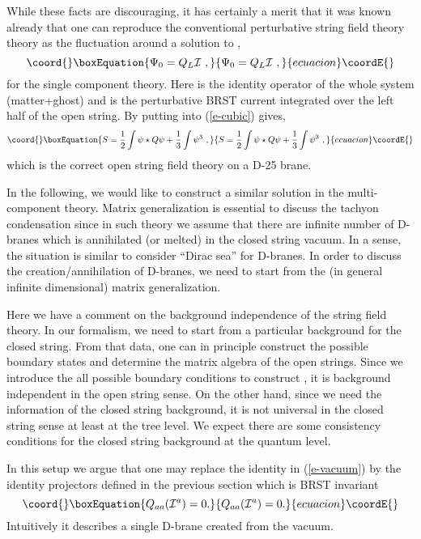 \documentclass[a4paper,12pt]{article}
\begin{document}
While these facts are discouraging,
it has certainly  a  merit that it was known already
\cite{r-HLRS,r-Romans} that one can 
reproduce the conventional perturbative string field theory
theory  as the fluctuation around a
solution to \coordHE{},
\begin{equation}\coord{}\boxEquation{\label{e-vacuum}
 \Psi_0= Q_L \cI\,\,,
}{\Psi_0= Q_L \cI\,\,,
}{ecuacion}\coordE{}\end{equation}
for the single component theory.
Here \myHighlight{$\cI$}\coordHE{} is the identity operator of the whole system
(matter+ghost) and \coordHE{} is the perturbative BRST current
integrated over the left half of the open string.
By putting \coordHE{} into 
(\ref{e-cubic}) gives,
\begin{equation}\coord{}\boxEquation{
 S=\frac{1}{2} \int \psi \star Q \psi +\frac{1}{3} \int \psi^3\,\,,
}{
 S=\frac{1}{2} \int \psi \star Q \psi +\frac{1}{3} \int \psi^3\,\,,
}{ecuacion}\coordE{}\end{equation}
which is the correct open string field theory on a D-25 brane.

In the following, we would like to construct 
a similar solution in the multi-component theory.
Matrix generalization is essential to discuss
the tachyon condensation since in such theory we assume
that there are infinite number of D-branes which is annihilated
(or melted) in the closed string vacuum.  In a sense, the situation
is similar to consider ``Dirac sea'' for D-branes.
In order to discuss
the creation/annihilation of D-branes, we need to start from
the (in general infinite dimensional) matrix generalization.

Here we have a comment on the background independence of the string
field theory. In our formalism, we need to start from a particular
background for the closed string. From that data,  one can in principle
construct the possible boundary states and determine the matrix
algebra of the open strings.  Since we introduce the all possible
boundary conditions to construct \myHighlight{$\Psi$}\coordHE{}, it is background independent
in the open string sense.  On the other hand, since we need the
information of the closed string background, it is not universal
in the closed string sense at least at the tree level.
We expect there are some consistency conditions for the
closed string background at the quantum level.

In this setup we argue that one may replace the identity
in (\ref{e-vacuum}) by the identity projectors defined 
in the previous section which is BRST invariant
\begin{equation}\coord{}\boxEquation{
 Q_{aa}(\cI^a)=0.
}{
 Q_{aa}(\cI^a)=0.
}{ecuacion}\coordE{}\end{equation}
Intuitively it describes a single D-brane
created from the vacuum.
\end{document}
